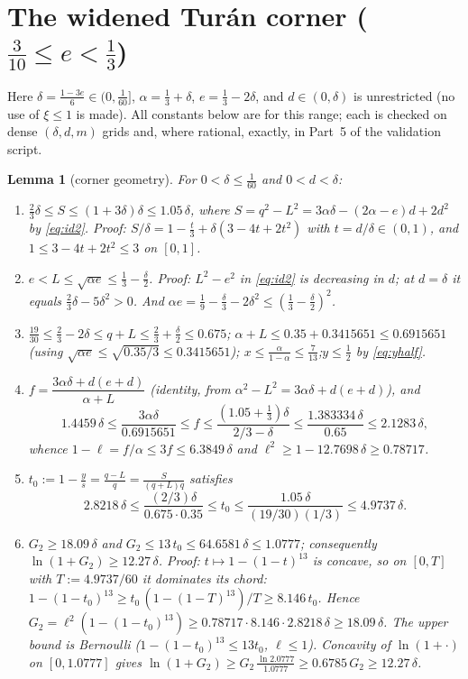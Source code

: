 \documentclass[11pt]{amsart}
\newtheorem{lemma}[theorem]{Lemma}
\begin{document}
\section{The widened Tur\'an corner ($\tfrac3{10}\le e<\tfrac13$)}
\label{sec:wide}

Here $\delta=\tfrac{1-3e}6\in(0,\tfrac1{60}]$, $\alpha=\tfrac13+\delta$,
$e=\tfrac13-2\delta$, and $d\in(0,\delta)$ is unrestricted (no use of
$\xi\le1$ is made).  All constants below are for this range; each is checked
on dense $(\delta,d,m)$ grids and, where rational, exactly, in Part~5 of the
validation script.

\begin{lemma}[corner geometry]\label{lem:corner-geo}
For $0<\delta\le\tfrac1{60}$ and $0<d<\delta$:
\begin{enumerate}
\item[(C1)] $\tfrac23\delta\le S\le(1+3\delta)\delta\le1.05\,\delta$, where
 $S=q^2-L^2=3\alpha\delta-(2\alpha-e)d+2d^2$ by \eqref{eq:id2}.
 \emph{Proof:} $S/\delta=1-\tfrac t3+\delta(3-4t+2t^2)$ with
 $t=d/\delta\in(0,1)$, and $1\le3-4t+2t^2\le3$ on $[0,1]$.
\item[(C2)] $e<L\le\sqrt{\alpha e}\le\tfrac13-\tfrac\delta2$.
 \emph{Proof:} $L^2-e^2$ in \eqref{eq:id2} is decreasing in $d$; at
 $d=\delta$ it equals $\tfrac23\delta-5\delta^2>0$.  And
 $\alpha e=\tfrac19-\tfrac\delta3-2\delta^2
 \le(\tfrac13-\tfrac\delta2)^2$.
\item[(C3)] $\tfrac{19}{30}\le\tfrac23-2\delta\le q+L\le\tfrac23
 +\tfrac\delta2\le0.675$;\quad
 $\alpha+L\le0.35+0.3415651\le0.6915651$
 (using $\sqrt{\alpha e}\le\sqrt{0.35/3}\le0.3415651$);\quad
 $x\le\tfrac\alpha{1-\alpha}\le\tfrac7{13}$;\quad $y\le\tfrac12$
 by \eqref{eq:yhalf}.
\item[(C4)] $f=\dfrac{3\alpha\delta+d(e+d)}{\alpha+L}$
 (identity, from $\alpha^2-L^2=3\alpha\delta+d(e+d)$), and
 \[
  1.4459\,\delta\le\frac{3\alpha\delta}{0.6915651}\le f
  \le\frac{(1.05+\tfrac13)\delta}{2/3-\delta}\le
  \frac{1.383334\,\delta}{0.65}\le2.1283\,\delta,
 \]
 whence $1-\ell=f/\alpha\le3f\le6.3849\,\delta$ and
 $\ell^2\ge1-12.7698\,\delta\ge0.78717$.
\item[(C5)] $t_0:=1-\tfrac ys=\tfrac{q-L}q=\tfrac S{(q+L)q}$ satisfies
 \[
  2.8218\,\delta\le\frac{(2/3)\delta}{0.675\cdot0.35}\le t_0\le
  \frac{1.05\,\delta}{(19/30)(1/3)}\le4.9737\,\delta .
 \]
\item[(C6)] $G_2\ge18.09\,\delta$ and $G_2\le13\,t_0\le64.6581\,\delta
 \le1.0777$; consequently $\ln(1+G_2)\ge12.27\,\delta$.
 \emph{Proof:} $t\mapsto1-(1-t)^{13}$ is concave, so on
 $[0,T]$ with $T:=4.9737/60$ it dominates its chord:
 $1-(1-t_0)^{13}\ge t_0\,(1-(1-T)^{13})/T\ge8.146\,t_0$.  Hence
 $G_2=\ell^2(1-(1-t_0)^{13})\ge0.78717\cdot8.146\cdot2.8218\,\delta
 \ge18.09\,\delta$.  The upper bound is Bernoulli
 ($1-(1-t_0)^{13}\le13t_0$, $\ell\le1$).  Concavity of $\ln(1+\cdot)$ on
 $[0,1.0777]$ gives
 $\ln(1+G_2)\ge G_2\,\tfrac{\ln2.0777}{1.0777}\ge0.6785\,G_2
 \ge12.27\,\delta$.
\end{enumerate}
\end{lemma}
\end{document}
